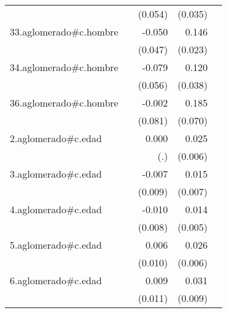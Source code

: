 {\begin{longtable}{l*{4}{D{.}{.}{-1}}}
            &                     &     (0.054)         &     (0.035)         &                     \\
\addlinespace
33.aglomerado#c.hombre&                     &      -0.050         &       0.146\sym{***}&                     \\
            &                     &     (0.047)         &     (0.023)         &                     \\
\addlinespace
34.aglomerado#c.hombre&                     &      -0.079         &       0.120\sym{**} &                     \\
            &                     &     (0.056)         &     (0.038)         &                     \\
\addlinespace
36.aglomerado#c.hombre&                     &      -0.002         &       0.185\sym{**} &                     \\
            &                     &     (0.081)         &     (0.070)         &                     \\
\addlinespace
2.aglomerado#c.edad&                     &       0.000         &       0.025\sym{***}&                     \\
            &                     &         (.)         &     (0.006)         &                     \\
\addlinespace
3.aglomerado#c.edad&                     &      -0.007         &       0.015\sym{*}  &                     \\
            &                     &     (0.009)         &     (0.007)         &                     \\
\addlinespace
4.aglomerado#c.edad&                     &      -0.010         &       0.014\sym{**} &                     \\
            &                     &     (0.008)         &     (0.005)         &                     \\
\addlinespace
5.aglomerado#c.edad&                     &       0.006         &       0.026\sym{***}&                     \\
            &                     &     (0.010)         &     (0.006)         &                     \\
\addlinespace
6.aglomerado#c.edad&                     &       0.009         &       0.031\sym{***}&                     \\
            &                     &     (0.011)         &     (0.009)         &                     \\

\end{longtable}}
